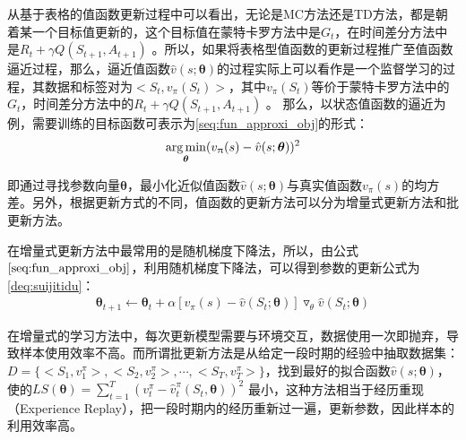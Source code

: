 从基于表格的值函数更新过程中可以看出，无论是MC方法还是TD方法，都是朝着某一个目标值更新的，这个目标值在蒙特卡罗方法中是$G_{t}$，在时间差分方法中是$R_{t}+\gamma Q(S_{t+1},A_{t+1})$
。所以，如果将表格型值函数的更新过程推广至值函数逼近过程，那么，逼近值函数$\hat{v}(s;\bm{\theta})$的过程实际上可以看作是一个监督学习的过程，其数据和标签对为$<S_{t}, v_{\pi}(S_{t})>$，其中$v_{\pi}(S_{t})$等价于蒙特卡罗方法中的$G_{t}$，时间差分方法中的$R_{t}+\gamma Q(S_{t+1},A_{t+1})$
。
那么，以状态值函数的逼近为例，需要训练的目标函数可表示为\eqref{seq:fun_approxi_obj}的形式：
\begin{equation}
\label{seq:fun_approxi_obj}
\begin{aligned}
\operatorname*{arg\,min}_{\bm{\theta}}(v_{\uppi}(s)-\hat{v}(s;\bm{\theta}))^2
\end{aligned}
\end{equation}

即通过寻找参数向量$\bm{\theta}$，最小化近似值函数$\hat{v}(s;\bm{\theta})$与真实值函数$v_{\pi}(s)$的均方差。另外，根据更新方式的不同，值函数的更新方法可以分为增量式更新方法和批更新方法。

在增量式更新方法中最常用的是随机梯度下降法，所以，由公式$\eqref{seq:fun_approxi_obj}$，利用随机梯度下降法，可以得到参数的更新公式为\eqref{deq:suijitidu}：
\begin{equation}\label{deq:suijitidu}
\begin{aligned}
\bm{\theta}_{t+1} \gets \bm{\theta}_{t} + \alpha[v_{\pi}(s)-\hat{v}(S_{t};\bm{\theta})]\triangledown_{\theta} \hat{v}(S_{t};\bm{\theta})
\end{aligned}
\end{equation}



在增量式的学习方法中，每次更新模型需要与环境交互，数据使用一次即抛弃，导致样本使用效率不高。而所谓批更新方法是从给定一段时期的经验中抽取数据集：$D=\{<S_{1},v^{\pi}_{1}>,<S_{2},v^{\pi}_{2}>,\cdots,<S_{T},v^{\pi}_{T}>\}$，找到最好的拟合函数$\hat{v}(s;\bm{\theta})$，使的$LS(\bm{\theta})=\sum_{t=1}^{T}(v^{\pi}_{t}-\hat{v}^{\pi}_{t}(S_{t},\bm{\theta}))^2$ 最小，这种方法相当于经历重现（Experience Replay），把一段时期内的经历重新过一遍，更新参数，因此样本的利用效率高。

